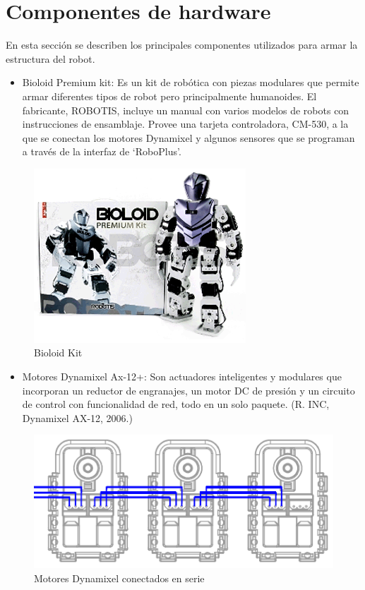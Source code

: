 \section{Componentes de hardware}
En esta sección se describen los principales componentes utilizados para armar la estructura del robot.
\begin{itemize}
\item Bioloid Premium kit: Es un kit de robótica con piezas modulares que permite armar diferentes tipos de robot pero principalmente humanoides. El fabricante, ROBOTIS, incluye un manual con varios modelos de robots con instrucciones de ensamblaje. Provee una tarjeta controladora, CM-530, a la que se conectan los motores Dynamixel y algunos sensores que se programan a través de la interfaz de ‘RoboPlus’.

\end{itemize}

\begin{figure}[hbtp]
\caption{Bioloid Kit}
\centering
\includegraphics[scale=0.5]{imagenes/product_bioloid17.png}
\end{figure}

\begin{itemize}

\item Motores Dynamixel Ax-12+: Son actuadores inteligentes y modulares que incorporan un reductor de engranajes, un motor DC de presión y un circuito de control con funcionalidad de red, todo en un solo paquete. (R. INC, Dynamixel AX-12, 2006.)
\end{itemize}

\begin{figure}[hbtp]
\caption{Motores Dynamixel conectados en serie}
\centering
\includegraphics[scale=0.5]{imagenes/AX-12_serie.png}
\end{figure}

